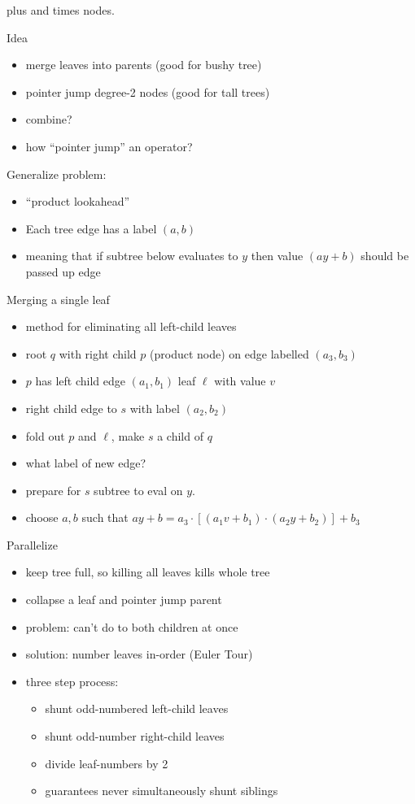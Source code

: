 \documentclass[12pt]{article}
\begin{document}
plus and times nodes.

Idea
\begin{itemize}
\item merge leaves into parents (good for bushy tree)
\item pointer jump degree-2 nodes (good for tall trees)
\item combine?
\item how ``pointer jump'' an operator?
\end{itemize}

Generalize problem:
\begin{itemize}
\item ``product lookahead''
\item Each tree edge has a label $(a,b)$ 
\item meaning that if subtree below evaluates to $y$ then value
  $(ay+b)$ should be passed up edge
\end{itemize}

Merging a single leaf
\begin{itemize}
\item method for eliminating all left-child leaves
\item root $q$ with right child $p$ (product node) on edge labelled $(a_3,b_3)$
\item $p$ has left child edge $(a_1,b_1)$ leaf $\ell$ with value $v$
\item right child edge to $s$ with label $(a_2,b_2)$
\item fold out $p$ and $\ell$, make $s$ a child of $q$
\item what label of new edge?
\item prepare for $s$ subtree to eval on $y$.
\item choose $a,b$ such that
  $ay+b=a_3\cdot[(a_1v+b_1)\cdot(a_2y+b_2)]+b_3$
\end{itemize}

Parallelize
\begin{itemize}
\item keep tree full, so killing all leaves kills whole tree
\item collapse a leaf and pointer jump parent
\item problem: can't do to both children at once
\item solution: number leaves in-order (Euler Tour)
\item three step process:
\begin{itemize}
\item shunt odd-numbered left-child leaves
\item shunt odd-number right-child leaves
\item divide leaf-numbers by 2
\item guarantees never simultaneously shunt siblings
\end{itemize}
\end{itemize}
\end{document}
